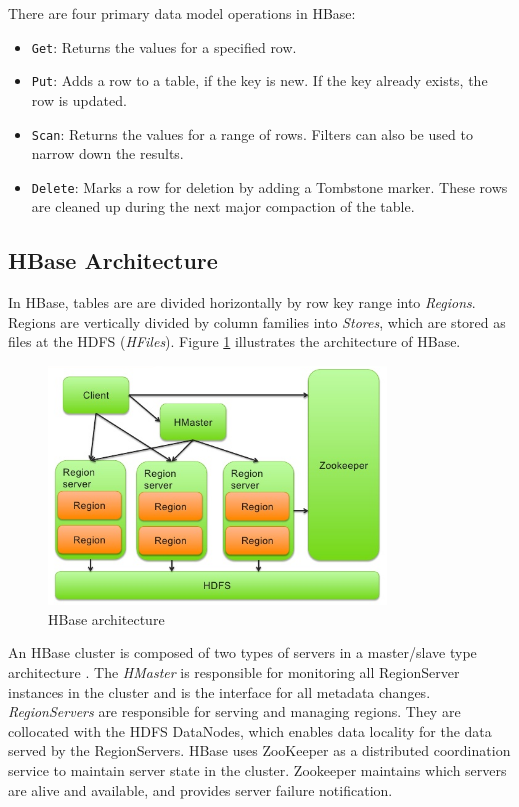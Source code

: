 There are four primary data model operations in HBase:
\begin{itemize}
\item \texttt{Get}: Returns the values for a specified row.
\item \texttt{Put}: Adds a row to a table, if the key is new. If the key already exists, the row is updated.
\item \texttt{Scan}: Returns the values for a range of rows. Filters can also be used to narrow down the results.
\item \texttt{Delete}: Marks a row for deletion by adding a Tombstone marker. These rows are cleaned up during the next major compaction of the table.
\end{itemize}

\subsection{HBase Architecture}

In HBase, tables are are divided horizontally by row key range into \emph{Regions}. Regions are vertically divided by column families into \emph{Stores}, which are stored as files at the HDFS (\emph{HFiles}). Figure \ref{figure:hbase_architecture} illustrates the architecture of HBase.

\begin{figure}[h!]
\centering
\includegraphics[width=0.8\textwidth]{figures/hbase_architecture}
\caption{HBase architecture}
\label{figure:hbase_architecture}
\end{figure}

An HBase cluster is composed of two types of servers in a master/slave type architecture \cite{mapr_hbase_architecture}. The \emph{HMaster} is responsible for monitoring all RegionServer instances in the cluster and is the interface for all metadata changes. \emph{RegionServers} are responsible for serving and managing regions. They are collocated with the HDFS DataNodes, which enables data locality for the data served by the RegionServers. HBase uses ZooKeeper as a distributed coordination service to maintain server state in the cluster. Zookeeper maintains which servers are alive and available, and provides server failure notification.


